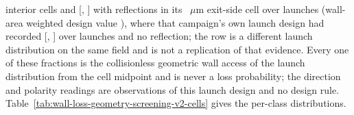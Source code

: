 {\WlhPTwoInteriorCells{} interior cells and \WlhPTwoExitP{} [\WlhPTwoExitLo,
\WlhPTwoExitHi] with \WlhPTwoExitReflections{} reflections in its
\WlhPTwoExitLengthUm~$\mu$m exit-side cell over \WlhPTwoExitN{} launches (wall-area
weighted design value \WlhPTwoPooledArea), where that campaign's own launch design had
recorded \WlhVFourP{} [\WlhVFourLo, \WlhVFourHi] over \WlhVFourTrials{} launches and no
reflection; the row is a different launch distribution on the same field and is
not a replication of that evidence. Every one of these fractions is the collisionless
geometric wall access of the launch distribution from the cell midpoint and is never a
loss probability; the direction and polarity readings are observations of this launch
design and no design rule.}
Table~\ref{tab:wall-loss-geometry-screening-v2-cells} gives the per-class
distributions.
\WlhCellClassTable

